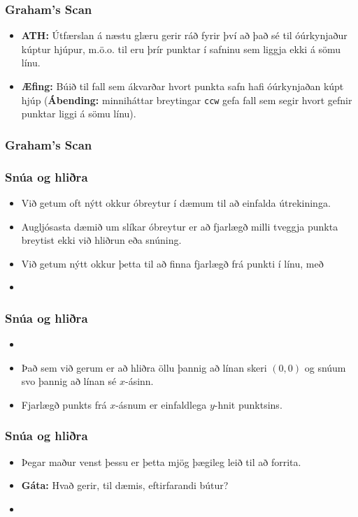 \documentclass{beamer}
\newcommand\env[2]
{
	\begin{#1}
	#2
	\end{#1}
}
\newcommand\code[1]{\tiny}
\begin{document}
\env{frame}
{
	\frametitle{Graham's Scan}
	\env{itemize}
	{
		\item<1-> {\bf ATH:} Útfærslan á næstu glæru gerir ráð fyrir því að það sé til óúrkynjaður kúptur hjúpur,
			m.ö.o. til eru þrír punktar í safninu sem liggja ekki á sömu línu.
		\item<2-> {\bf Æfing:} Búið til fall sem ákvarðar hvort punkta safn hafi óúrkynjaðan kúpt hjúp ({\bf Ábending:}
			minniháttar breytingar \texttt{ccw} gefa fall sem segir hvort gefnir punktar liggi á sömu línu).
	}
}

\env{frame}
{
	\frametitle{Graham's Scan}
	\code{convex_hull.h}
}

\env{frame}
{
	\frametitle{Snúa og hliðra}
	\env{itemize}
	{
		\item<1-> Við getum oft nýtt okkur óbreytur í dæmum til að einfalda útrekininga.
		\item<2-> Augljósasta dæmið um slíkar óbreytur er að fjarlægð milli tveggja punkta breytist ekki við hliðrun eða snúning.
		\item<3-> Við getum nýtt okkur þetta til að finna fjarlægð frá punkti í línu, með
		\item<4-> \code{p2l-alt.h}
	}
}

\env{frame}
{
	\frametitle{Snúa og hliðra}
	\env{itemize}
	{
		\item<1-> \code{p2l-alt.h}
		\item<2-> Það sem við gerum er að hliðra öllu þannig að línan skeri $(0, 0)$ og snúum svo þannig að línan sé $x$-ásinn.
		\item<3-> Fjarlægð punkts frá $x$-ásnum er einfaldlega $y$-hnit punktsins.
	}
}

\env{frame}
{
	\frametitle{Snúa og hliðra}
	\env{itemize}
	{
		\item<1-> Þegar maður venst þessu er þetta mjög þægileg leið til að forrita. 
		\item<2-> {\bf Gáta:} Hvað gerir, til dæmis, eftirfarandi bútur?
		\item<3-> \code{gata.h}
	}
}

\end{document}

